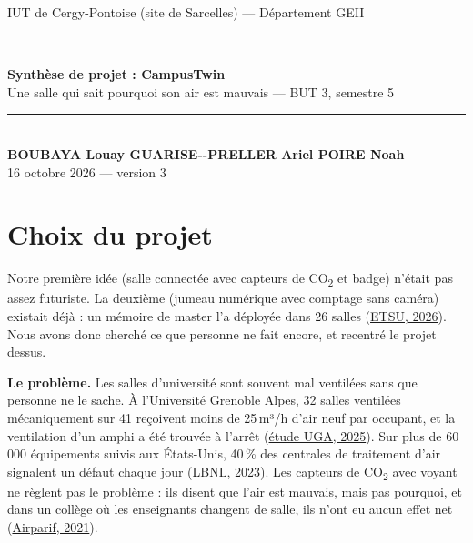 \documentclass[10pt,a4paper]{article}
\newcommand{\COtwo}{CO\textsubscript{2}}
\begin{document}
\thispagestyle{empty}
\begin{center}
  {\color{grisleg}\small IUT de Cergy-Pontoise (site de Sarcelles) — Département GEII}\\[0.3em]
  {\color{bleucy}\rule{0.85\linewidth}{1.2pt}}\\[0.5em]
  {\LARGE\bfseries\color{bleucy} Synthèse de projet : CampusTwin}\\[0.2em]
  {\large Une salle qui sait pourquoi son air est mauvais — BUT 3, semestre 5}\\[0.5em]
  {\color{bleucy}\rule{0.85\linewidth}{1.2pt}}\\[0.6em]
  {\large\bfseries BOUBAYA Louay \;\textbullet\; GUARISE-{}-PRELLER Ariel \;\textbullet\; POIRE Noah}\\[0.3em]
  {\small\color{grisleg} 16 octobre 2026 — version 3}
\end{center}

\section{Choix du projet}
Notre première idée (salle connectée avec capteurs de \COtwo{} et badge) n'était pas assez futuriste. La deuxième (jumeau numérique avec comptage sans caméra) existait déjà : un mémoire de master l'a déployée dans 26 salles (\href{https://dc.etsu.edu/etd/4702}{ETSU, 2026}). Nous avons donc cherché ce que personne ne fait encore, et recentré le projet dessus.

\textbf{Le problème.} Les salles d'université sont souvent mal ventilées sans que personne ne le sache. À l'Université Grenoble Alpes, 32 salles ventilées mécaniquement sur 41 reçoivent moins de 25\,m³/h d'air neuf par occupant, et la ventilation d'un amphi a été trouvée à l'arrêt (\href{https://blog.landot-avocats.net/2025/06/14/qualite-de-lair-interieur-et-universites-1-etat-du-droit-2-lien-vers-une-conference-3-interview-du-pr-philippe-cinquin/}{étude UGA, 2025}). Sur plus de 60\,000 équipements suivis aux États-Unis, 40\,\% des centrales de traitement d'air signalent un défaut chaque jour (\href{https://eta-publications.lbl.gov/bibcite/reference/36129}{LBNL, 2023}). Les capteurs de \COtwo{} avec voyant ne règlent pas le problème : ils disent que l'air est mauvais, mais pas pourquoi, et dans un collège où les enseignants changent de salle, ils n'ont eu aucun effet net (\href{https://www.airparif.asso.fr/sites/default/files/document_publication/Aerons_Synthese_Airparif.pdf}{Airparif, 2021}).
\end{document}
